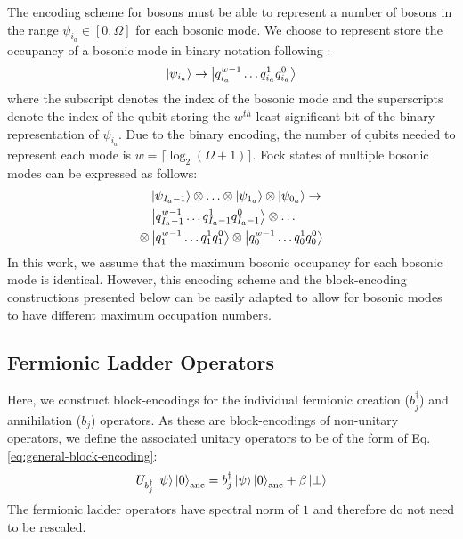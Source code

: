 The encoding scheme for bosons must be able to represent a number of bosons in the range $\psi_{i_a} \in [0, \Omega]$ for each bosonic mode.
We choose to represent store the occupancy of a bosonic mode in binary notation following \cite{rhodes2024exponential}:
\begin{equation}
    \ket{\psi_{i_a}} \rightarrow \ket{q_{i_a}^{w-1} \hdots q_{i_a}^{1} q_{i_a}^0}
\end{equation}
where the subscript denotes the index of the bosonic mode and the superscripts denote the index of the qubit storing the $w^{th}$ least-significant bit of the binary representation of $\psi_{i_a}$.
Due to the binary encoding, the number of qubits needed to represent each mode is $w = \lceil \log_2{(\Omega + 1)} \rceil$.
Fock states of multiple bosonic modes can be expressed as follows:
\begin{equation}
    \begin{split}
        &\ket{\psi_{I_a - 1}} \otimes \hdots \otimes \ket{\psi_{1_a}} \otimes \ket{\psi_{0_a}} \rightarrow \\
        &\ket{q_{I_a - 1}^{w-1} \hdots q_{I_a - 1}^{1} q_{I_a - 1}^0} \otimes \hdots \\
        \otimes &\ket{q_{1}^{w-1} \hdots q_{1}^{1} q_{1}^0} \otimes \ket{q_{0}^{w-1} \hdots q_{0}^{1} q_{0}^0} \\
    \end{split}
\end{equation}
In this work, we assume that the maximum bosonic occupancy for each bosonic mode is identical.
However, this encoding scheme and the block-encoding constructions presented below can be easily adapted to allow for bosonic modes to have different maximum occupation numbers.

\subsection{Fermionic Ladder Operators}
\label{subsec:fermionic-be}

Here, we construct block-encodings for the individual fermionic creation ($b_j^\dagger$) and annihilation ($b_j$) operators.
As these are block-encodings of non-unitary operators, we define the associated unitary operators to be of the form of Eq. \ref{eq:general-block-encoding}:
\begin{equation}
    U_{b^\dagger_j} \ket{\psi} \ket{0}_\text{anc} = b^\dagger_j \ket{\psi}\ket{0}_\text{anc} + \beta \ket{\perp}
\end{equation}
The fermionic ladder operators have spectral norm of $1$ and therefore do not need to be rescaled.

